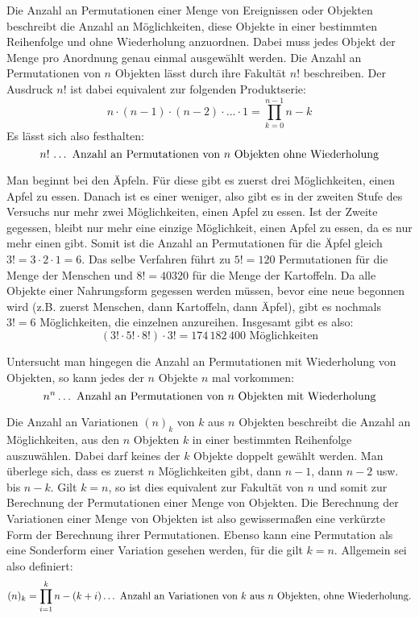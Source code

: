 Die Anzahl an Permutationen einer Menge von Ereignissen oder Objekten beschreibt die Anzahl an M\"{o}glichkeiten, diese Objekte in einer bestimmten Reihenfolge und ohne Wiederholung anzuordnen. Dabei muss jedes Objekt der Menge pro Anordnung genau einmal ausgew\"{a}hlt werden. Die Anzahl an Permutationen von $n$ Objekten l\"{a}sst durch ihre Fakult\"{a}t $n!$ beschreiben. Der Ausdruck $n!$ ist dabei equivalent zur folgenden Produktserie: $$n \cdot (n - 1) \cdot (n - 2) \cdot ... \cdot 1 = \prod_{k=0}^{n - 1} n - k$$ Es l\"{a}sst sich also festhalten: $$n! \, \dots \,\, \text{Anzahl an Permutationen von $n$ Objekten ohne Wiederholung}$$


Man beginnt bei den \"{A}pfeln. F\"{u}r diese gibt es zuerst drei M\"{o}glichkeiten, einen Apfel zu essen. Danach ist es einer weniger, also gibt es in der zweiten Stufe des Versuchs nur mehr zwei M\"{o}glichkeiten, einen Apfel zu essen. Ist der Zweite gegessen, bleibt nur mehr eine einzige M\"{o}glichkeit, einen Apfel zu essen, da es nur mehr einen gibt. Somit ist die Anzahl an Permutationen f\"{u}r die \"{A}pfel gleich $3! = 3 \cdot 2 \cdot 1 = 6$. Das selbe Verfahren f\"{u}hrt zu $5! = 120$ Permutationen f\"{u}r die Menge der Menschen und $8! = 40320$ f\"{u}r die Menge der Kartoffeln. Da alle Objekte einer Nahrungsform gegessen werden m\"{u}ssen, bevor eine neue begonnen wird (z.B. zuerst Menschen, dann Kartoffeln, dann \"{A}pfel), gibt es nochmals $3! = 6$ M\"{o}glichkeiten, die einzelnen  anzureihen. Insgesamt gibt es also: $$(3! \cdot 5! \cdot 8!) \cdot 3! = 174\,182\,400 \text{ M\"{o}glichkeiten}$$

Untersucht man hingegen die Anzahl an Permutationen mit Wiederholung von Objekten, so kann jedes der $n$ Objekte $n$ mal vorkommen: $$n^n \dots \,\, \text{Anzahl an Permutationen von $n$ Objekten mit Wiederholung}$$


Die Anzahl an Variationen $(n)_k$ von $k$ aus $n$ Objekten beschreibt die Anzahl an M\"{o}glichkeiten, aus den $n$ Objekten $k$ in einer bestimmten Reihenfolge auszuw\"{a}hlen. Dabei darf keines der $k$ Objekte doppelt gew\"{a}hlt werden. Man \"{u}berlege sich, dass es zuerst $n$ M\"{o}glichkeiten gibt, dann $n-1$, dann $n-2$ usw. bis $n-k$. Gilt $k = n$, so ist dies equivalent zur Fakult\"{a}t von $n$ und somit zur Berechnung der Permutationen einer Menge von Objekten. Die Berechnung der Variationen einer Menge von Objekten ist also gewisserma\ss{}en eine verk\"{u}rzte Form der Berechnung ihrer Permutationen. Ebenso kann eine Permutation als eine Sonderform einer Variation gesehen werden, f\"{u}r die gilt $k = n$. Allgemein sei also definiert: $$(n)_k = \prod_{i=1}^{k} n - (k + i) \dots \,\, \text{Anzahl an Variationen von $k$ aus $n$ Objekten, ohne Wiederholung.} $$

